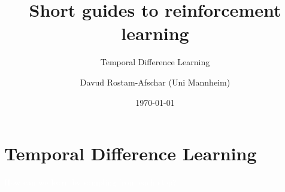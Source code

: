 \documentclass[11pt,table]{beamer}
\title[]{Short guides to reinforcement learning}
\subtitle[]{Temporal Difference Learning}
\author[D. Rostam-Afschar]{\textcolor{gray1}{Davud Rostam-Afschar (Uni Mannheim)}}
\date[]{\today}
\begin{document}
\begin{frame}[plain]
  \titlepage
\end{frame}


\section{Temporal Difference Learning}
{
\begin{frame}
\centering
\Huge
\textcolor{white}{How can we learn by sampling from each step?}
\thispagestyle{empty}
\end{frame}
}
\end{document}
